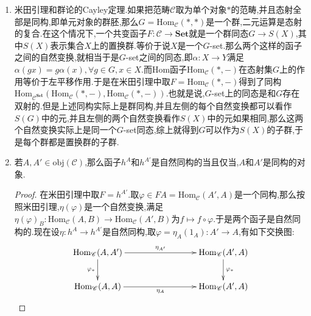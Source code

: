 \begin{enumerate}
\begin{proof}
		于是我们定义了一个从$FA\to\mathrm{Nat}(h^A,F)$映射.现在定义逆映射$\kappa$,它把$h^A\to F$的自然变换$\alpha$映射为$\alpha_A(1_A)\in FA$.那么一方面,对任意的$a\in FA$有$\eta(a)_A(1_A)=F(1_A)(a)=1_{FA}(a)=a$.另一方面对任意的$h^A\to F$的自然变换$\alpha$有$\eta(\alpha_A(1_A))=\alpha$,为此,只要利用如下交换图,有$\eta(\alpha_A(1_A))_B(f)=F(f)(\alpha_A(1_A))=(F(f)\circ\eta_A)(1_A)=(\eta_B\circ\mathrm{Hom}_{\mathscr{C}}(A,f))(1_A)=\alpha_B(f)$,完成证明.
		$$\xymatrix{\mathrm{Hom}_{\mathscr{C}}(A,A)\ar[rrrr]^{\eta(a)_A}\ar[d]_{\mathrm{Hom}_{\mathscr{C}}(A,f)}&&&&FA\ar[d]^{F(f)}\\\mathrm{hom}_{\mathscr{C}}(A,B)\ar[rrrr]_{\eta(a)_{B}}&&&&FB}$$
	\end{proof}
	\item 米田引理和群论的Cayley定理.如果把范畴$\mathscr{C}$取为单个对象$\ast$的范畴,并且态射全部是同构,即单元对象的群胚,那么$G=\mathrm{Hom}_{\mathscr{C}}(\ast,\ast)$是一个群,二元运算是态射的复合.在这个情况下,一个共变函子$F:\mathscr{C}\to\textbf{Set}$就是一个群同态$G\to S(X)$,其中$S(X)$表示集合$X$上的置换群.等价于说$X$是一个$G$-set.那么两个这样的函子之间的自然变换,就相当于是$G$-set之间的同态,即$\alpha:X\to Y$满足$\alpha(gx)=g\alpha(x),\forall g\in G,x\in X$.而Hom函子$\mathrm{Hom}_{\mathscr{C}}(\ast,-)$在态射集$G$上的作用等价于左平移作用.于是在米田引理中取$F=\mathrm{Hom}_{\mathscr{C}}(\ast,-)$得到了同构$\mathrm{Hom}_{\mathscr{C}^{\textbf{Set}}}(\mathrm{Hom}_{\mathscr{C}}(\ast,-),\mathrm{Hom}_{\mathscr{C}}(\ast,-))$.也就是说,$G$-set上的同态是和$G$存在双射的.但是上述同构实际上是群同构,并且左侧的每个自然变换都可以看作$S(G)$中的元,并且左侧的两个自然变换看作$S(X)$中的元如果相同,那么这两个自然变换实际上是同一个$G$-set同态,综上就得到$G$可以作为$S(X)$的子群,于是每个群都是置换群的子群.
	\item 若$A,A'\in\mathrm{obj}(\mathscr{C})$,那么函子$h^A$和$h^{A'}$是自然同构的当且仅当,$A$和$A'$是同构的对象.
	\begin{proof} 
		
		在米田引理中取$F=h^{A'}$.取$\varphi\in FA=\mathrm{Hom}_{\mathscr{C}}(A',A)$是一个同构,那么按照米田引理,$\eta(\varphi)$是一个自然变换,满足$\eta(\varphi)_B:\mathrm{Hom}_{\mathscr{C}}(A,B)\to\mathrm{Hom}_{\mathscr{C}}(A',B)$为$f\mapsto f\circ\varphi$.于是两个函子是自然同构的.现在设$\eta:h^A\to h^{A'}$是自然同构,取$\varphi=\eta_A(1_A):A'\to A$,有如下交换图:
		$$\xymatrix{\mathrm{Hom}_{\mathscr{C}}(A,A')\ar[d]_{\varphi_*}\ar[rrr]^{\eta_{A'}}&&&\mathrm{Hom}_{\mathscr{C}}(A',A)\ar[d]^{\varphi_*}\\\mathrm{Hom}_{\mathscr{C}}(A,A)\ar[rrr]_{\eta_A}&&&\mathrm{Hom}_{\mathscr{C}}(A',A)}$$
		

\end{proof}
\end{enumerate}
